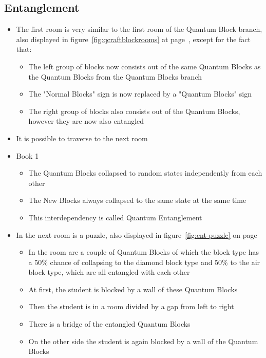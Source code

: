 \documentclass[11pt,twoside]{report} %
\begin{document}
\subsection{Entanglement}

\begin{itemize}
	\item The first room is very similar to the first room of the Quantum Block branch, also displayed in figure~\ref{fig:qcraftblockrooms} at page~\pageref{fig:qcraftblockrooms}, except for the fact that:
	\begin{itemize}
		\item The left group of blocks now consists out of the same Quantum Blocks as the Quantum Blocks from the Quantum Blocks branch
		\item The "Normal Blocks" sign is now replaced by a "Quantum Blocks" sign
		\item The right group of blocks also consists out of the Quantum Blocks, however they are now also entangled
	\end{itemize}
	\item It is possible to traverse to the next room
	\item Book 1
	\begin{itemize}
		\item The Quantum Blocks collapsed to random states independently from each other
		\item The New Blocks always collapsed to the same state at the same time
		\item This interdependency is called Quantum Entanglement
	\end{itemize}
	\item In the next room is a puzzle, also displayed in figure~\ref{fig:ent-puzzle} on page~\pageref{fig:ent-puzzle}
	\begin{itemize}
		\item In the room are a couple of Quantum Blocks of which the block type has a 50\% chance of collapsing to the diamond block type and 50\% to the air block type, which are all entangled with each other
		\item At first, the student is blocked by a wall of these Quantum Blocks
		\item Then the student is in a room divided by a gap from left to right
		\item There is a bridge of the entangled Quantum Blocks
		\item On the other side the student is again blocked by a wall of the Quantum Blocks
	\end{itemize}

\end{itemize}
\end{document}
